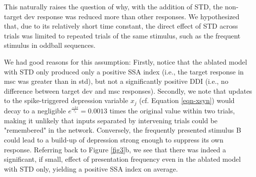 \documentclass[pdflatex,referee,iicol,sn-basic]{sn-jnl}
\theoremstyle{thmstyleone}%
\theoremstyle{thmstyletwo}%
\theoremstyle{thmstylethree}%
\begin{document}
This naturally raises the question of why, with the addition of STD, the non-target dev response was reduced more than other responses. We hypothesized that, due to its relatively short time constant, the direct effect of STD across trials was limited to repeated trials of the same stimulus, such as the frequent stimulus in oddball sequences.

We had good reasons for this assumption: Firstly, notice that the ablated model with STD only produced only a positive SSA index (i.e., the target response in msc was greater than in std), but not a significantly positive DDI (i.e., no difference between target dev and msc responses). Secondly, we note that updates to the spike-triggered depression variable $x_j$ (cf. Equation \ref{eqn-xsyn}) would decay to a negligible $e^\frac{-1 s}{\tau_x} = 0.0013$ times the original value within two trials, making it unlikely that inputs separated by intervening trials could be "remembered" in the network. Conversely, the frequently presented stimulus B could lead to a build-up of depression strong enough to suppress its own response. Referring back to Figure \ref{fig3}b, we see that there was indeed a significant, if small, effect of presentation frequency even in the ablated model with STD only, yielding a positive SSA index on average.
\end{document}
